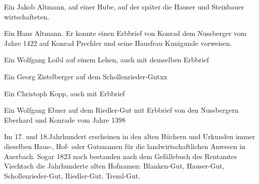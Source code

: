 \documentclass[12pt,a4pager]{book}
\begin{document}
\begin{compactitem}
\item Ein Jakob Altmann, auf einer Hube, auf der später die Hauser und
Steinbauer wirtschafteten.
\item Ein Hans Altmann. Er konnte einen Erbbrief von Konrad dem Nussberger vom
Jahre 1422 auf Konrad Prechler und seine Hausfrau Kunigunde vorweisen.
\item Ein Wolfgang Loibl auf einem Lehen, auch mit demselben Erbbrief
\item Ein Georg Zistelberger auf dem Schollenrieder-Gutxx
\item Ein Christoph Kopp, auch mit Erbbrief
\item Ein Wolfgang Ebner auf dem Riedler-Gut mit Erbbrief von den Nussbergern
Eberhard und Konrade vom Jahre 1398
\end{compactitem}

Im 17. und 18.Jahrhundert erscheinen in den alten Büchern und Urkunden immer
dieselben Haus-, Hof- oder Gutsnamen für die landwirtschaftlichen Anwesen in
Auerbach. Sogar 1823 noch bestanden nach dem Gefällebuch des Rentamtes Viechtach
die Jahrhunderte alten Hofnamen: Blanken-Gut, Hauser-Gut, Schollenrieder-Gut,
Riedler-Gut, Treml-Gut.
\end{document}
